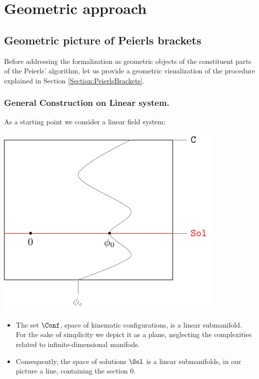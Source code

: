 \documentclass[Main]{subfiles}
\begin{document}
\section{Geometric approach}


	\subsection{Geometric picture of Peierls brackets}
		Before addressing the formalization as geometric objects of the constituent parts of the Peierls' algorithm, let us provide a geometric visualization of the procedure explained in Section \ref{Section:PeierlsBrackets}.
		
		\subsubsection{General Construction on Linear system.}
		As a starting point we consider a linear field system:

		\vspace{1mm}		
		\begin{minipage}{0.5\textwidth}
			\includegraphics[width=\textwidth]{Pictures/GeometricPicture0}
		\end{minipage}
		\begin{minipage}{0.5\textwidth}
			\begin{itemize}
				\item The set $\Conf$, space of kinematic configurations, is a linear submanifold.\\
					For the sake of simplicity we depict it as a plane, neglecting the complexities related to infinite-dimensional manifods.
				\item Consequently, the space of solutions $ \Sol$ is a linear submanifolds, in our picture a line, containing the section $0$.
			\end{itemize}
		\end{minipage}
		\vspace{1mm}\\
			
\end{document}
